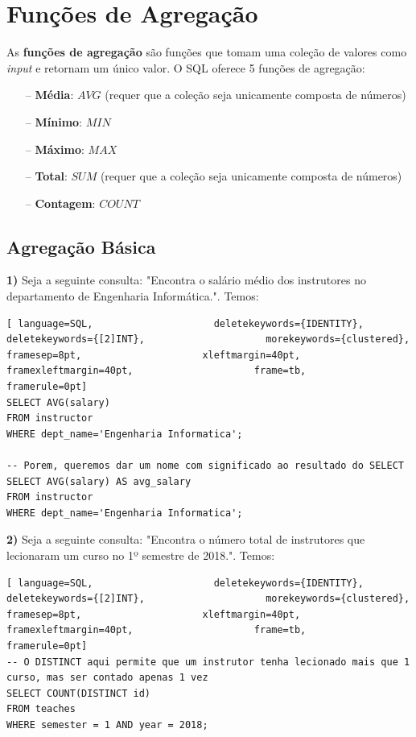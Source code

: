 \documentclass[titlepage]{book}
\theoremstyle{definition}
\begin{document}
\section{Funções de Agregação}
As \textbf{funções de agregação} são funções que tomam uma coleção de valores como \textit{input} e retornam um único valor. O SQL oferece 5 funções de agregação:
\begin{itemize}
    \itemsep0cm
    \item[--]\textbf{Média}: $AVG$ (requer que a coleção seja unicamente composta de números)
    \item[--]\textbf{Mínimo}: $MIN$
    \item[--]\textbf{Máximo}: $MAX$
    \item[--]\textbf{Total}: $SUM$ (requer que a coleção seja unicamente composta de números)
    \item[--]\textbf{Contagem}: $COUNT$
\end{itemize}

\subsection{Agregação Básica}
\textbf{1)} Seja a seguinte consulta: "Encontra o salário médio dos instrutores no departamento de Engenharia Informática.". Temos:
\begin{lstlisting}[ language=SQL,                     deletekeywords={IDENTITY},                     deletekeywords={[2]INT},                     morekeywords={clustered},                     framesep=8pt,                     xleftmargin=40pt,                     framexleftmargin=40pt,                     frame=tb,                     framerule=0pt]
SELECT AVG(salary)
FROM instructor
WHERE dept_name='Engenharia Informatica';

-- Porem, queremos dar um nome com significado ao resultado do SELECT
SELECT AVG(salary) AS avg_salary
FROM instructor
WHERE dept_name='Engenharia Informatica';
\end{lstlisting}

\textbf{2)} Seja a seguinte consulta: "Encontra o número total de instrutores que lecionaram um curso no 1º semestre de 2018.". Temos:
\begin{lstlisting}[ language=SQL,                     deletekeywords={IDENTITY},                     deletekeywords={[2]INT},                     morekeywords={clustered},                     framesep=8pt,                     xleftmargin=40pt,                     framexleftmargin=40pt,                     frame=tb,                     framerule=0pt]
-- O DISTINCT aqui permite que um instrutor tenha lecionado mais que 1 curso, mas ser contado apenas 1 vez
SELECT COUNT(DISTINCT id)
FROM teaches
WHERE semester = 1 AND year = 2018;
\end{lstlisting}
\end{document}
